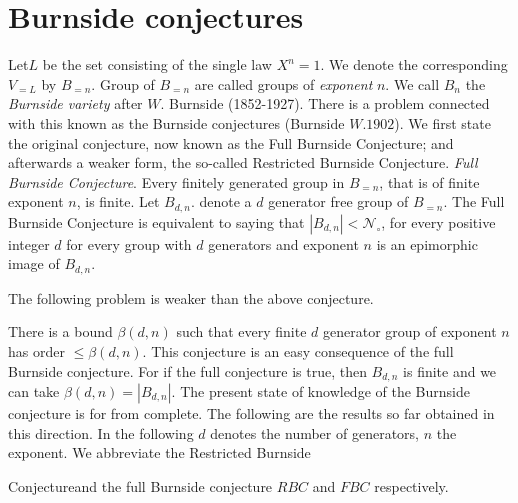 \section{Burnside conjectures}\label{chap5:sec3}%

Let\pageoriginale $L$ be the set consisting of the single law $X^n=1$. We denote the
corresponding $V_{=L}$ by $B_{=n}$. Group of $B_{=n}$ are called
groups of \textit{exponent} $n$. We call $B_n$ the \textit{Burnside
  variety} after $W$.  
Burnside (1852-1927). There is a problem connected with this known as
the Burnside conjectures (Burnside $W.1902$). We first state the
original conjecture, now known as the Full Burnside Conjecture; and
afterwards a weaker form, the so-called Restricted Burnside
Conjecture. \textit{Full Burnside Conjecture}. Every finitely
generated group in $B_{=n}$, that is of finite exponent $n$, is
finite. Let $B_{d, n}$. denote a $d$ generator free group of
$B_{=n}$. The Full Burnside Conjecture is equivalent to saying that $|
B_{d, n}| < \mathscr{N}_\circ$, for every positive integer $d$ for
every group with $d$ generators and exponent $n$ is an epimorphic
image of $B_{d, n}$. 

The following problem is weaker than the above conjecture.


There is a bound $\beta(d, n)$ such that every finite $d$ generator
group of exponent $n$ has order $\leq \beta(d, n)$. This conjecture is
an easy consequence of the full Burnside conjecture. For if the full
conjecture is true, then $B_{d, n}$ is finite and we can take
$\beta(d, n) = |B_{d, n}|$. The present state of knowledge of the
Burnside conjecture is for from complete. The following are the
results so far obtained in this direction. In the following $d$
denotes the number of generators, $n$ the exponent. We abbreviate the
Restricted Burnside  

Conjecture\pageoriginale and the full Burnside conjecture $RBC$ and $FBC$
respectively. 

